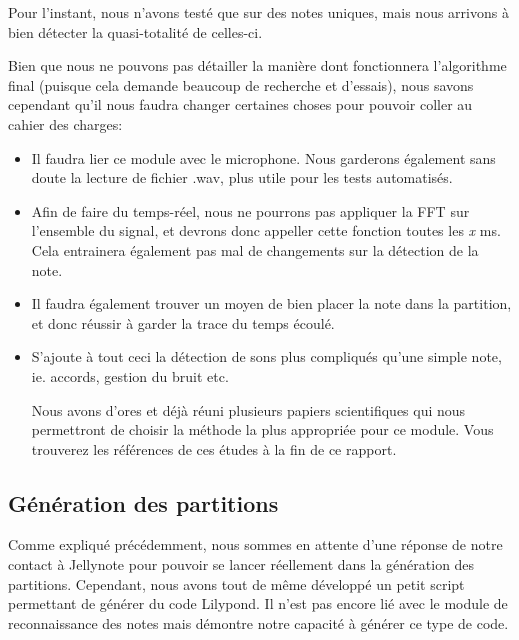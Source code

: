 \documentclass[12pt]{article}
\begin{document}
\par Pour l'instant, nous n'avons testé que sur des notes uniques, mais nous arrivons à bien détecter la quasi-totalité de celles-ci.\\

\par Bien que nous ne pouvons pas détailler la manière dont fonctionnera l'algorithme final (puisque cela demande beaucoup de recherche et d'essais), nous savons cependant qu'il nous faudra changer certaines choses pour pouvoir coller au cahier des charges:
\begin{itemize}

\item Il faudra lier ce module avec le microphone. Nous garderons également sans doute la lecture de fichier .wav, plus utile pour les tests automatisés.
\item Afin de faire du temps-réel, nous ne pourrons pas appliquer la FFT sur l'ensemble du signal, et devrons donc appeller cette fonction toutes les \emph{x} ms. Cela entrainera également pas mal de changements sur la détection de la note.
\item Il faudra également trouver un moyen de bien placer la note dans la partition, et donc réussir à garder la trace du temps écoulé.
\item S'ajoute à tout ceci la détection de sons plus compliqués qu'une simple note, ie. accords, gestion du bruit etc.

\par Nous avons d'ores et déjà réuni plusieurs papiers scientifiques qui nous permettront de choisir la méthode la plus appropriée pour ce module. Vous trouverez les références de ces études à la fin de ce rapport.

\end{itemize}

\subsection{Génération des partitions}

\par Comme expliqué précédemment, nous sommes en attente d'une réponse de notre contact à Jellynote pour pouvoir se lancer réellement dans la génération des partitions. Cependant, nous avons tout de même développé un petit script permettant de générer du code Lilypond. Il n'est pas encore lié avec le module de reconnaissance des notes mais démontre notre capacité à générer ce type de code.
\end{document}
